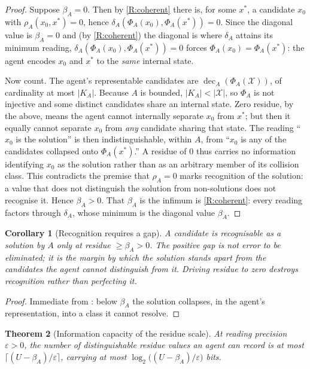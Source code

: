 \documentclass[twocolumn,10pt,a4paper]{article}
\theoremstyle{thmstyle}
\newtheorem{theorem}{Theorem}[section]
\newtheorem{corollary}[theorem]{Corollary}
\theoremstyle{definition}
\theoremstyle{remark}
\newcommand{\floor}{\beta}
\newcommand{\res}{\rho}
\newcommand{\abs}[1]{\lvert#1\rvert}
\newcommand{\eps}{\varepsilon}
\DeclareMathOperator{\dec}{dec}
\begin{document}
\begin{proof}
Suppose $\floor_A=0$. Then by \ref{R:coherent} there is, for some
$x^\ast$, a candidate $x_0$ with $\res_A(x_0,x^\ast)=0$, hence
$\delta_A(\Phi_A(x_0),\Phi_A(x^\ast))=0$. Since the diagonal value is
$\floor_A=0$ and (by \ref{R:coherent}) the diagonal is where $\delta_A$
attains its minimum reading, $\delta_A(\Phi_A(x_0),\Phi_A(x^\ast))=0$
forces $\Phi_A(x_0)=\Phi_A(x^\ast)$: the agent encodes $x_0$ and
$x^\ast$ to the \emph{same} internal state.

Now count. The agent's representable candidates are
$\dec_A(\Phi_A(\mathcal{X}))$, of cardinality at most $\abs{K_A}$. Because
$A$ is bounded, $\abs{K_A}<\abs{\mathcal{X}}$, so $\Phi_A$ is not
injective and some distinct candidates share an internal state. Zero
residue, by the above, means the agent cannot internally separate $x_0$
from $x^\ast$; but then it equally cannot separate $x_0$ from \emph{any}
candidate sharing that state. The reading ``$x_0$ is the solution'' is
then indistinguishable, within $A$, from ``$x_0$ is any of the candidates
collapsed onto $\Phi_A(x^\ast)$.'' A residue of $0$ thus carries no
information identifying $x_0$ as the solution rather than as an
arbitrary member of its collision class. This contradicts the premise
that $\res_A=0$ marks recognition of the solution: a value that does not
distinguish the solution from non-solutions does not recognise it. Hence
$\floor_A>0$. That $\floor_A$ is the infimum is \ref{R:coherent}: every
reading factors through $\delta_A$, whose minimum is the diagonal value
$\floor_A$.
\end{proof}

\begin{corollary}[Recognition requires a gap]
\label{cor:gap}
A candidate is recognisable as a solution by $A$ only at residue
$\ge\floor_A>0$. The positive gap is not error to be eliminated; it is
the margin by which the solution stands apart from the candidates the
agent cannot distinguish from it. Driving residue to zero destroys
recognition rather than perfecting it.
\end{corollary}

\begin{proof}
Immediate from : below $\floor_A$ the solution collapses,
in the agent's representation, into a class it cannot resolve.
\end{proof}

\begin{theorem}[Information capacity of the residue scale]
\label{thm:info}
At reading precision $\eps>0$, the number of distinguishable residue
values an agent can record is at most $\lceil(U-\floor_A)/\eps\rceil$,
carrying at most $\log_2\!\big((U-\floor_A)/\eps\big)$ bits.
\end{theorem}
\end{document}
